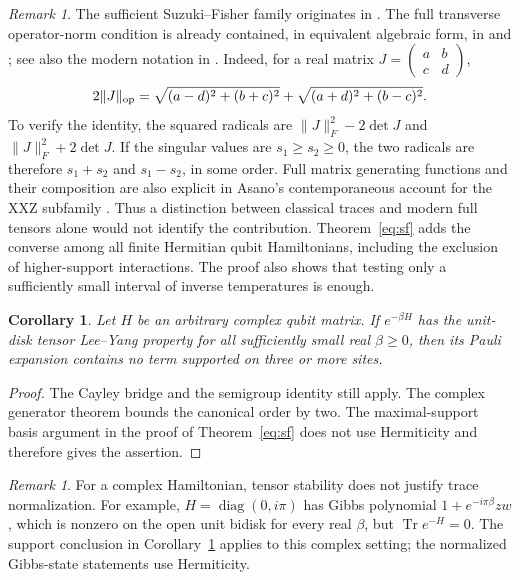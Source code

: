 \documentclass[reqno]{amsart}
\newtheorem{corollary}[theorem]{Corollary}
\theoremstyle{definition}
\theoremstyle{remark}
\newtheorem{remark}[theorem]{Remark}
\DeclareMathOperator{\Tr}{Tr}
\DeclareMathOperator{\diag}{diag}
\begin{document}
\begin{remark}\label{eq:sf-attribution}
The sufficient Suzuki--Fisher family originates in
\cite{SuzukiFisher71,AsanoJapanese70,AsanoPRL70}. The full transverse
operator-norm condition is already contained, in equivalent algebraic
form, in \cite[equation~(2.47)]{SuzukiFisher71} and
\cite[Theorem~2, equation~(8)]{Dunlop79}; see also the modern notation
in \cite[Definition~1 and Fact~3]{BGLW26}. Indeed, for a real matrix
$J=\left(\begin{smallmatrix}a&b\\c&d\end{smallmatrix}\right)$,
\[
 2\|J\|_{\rm op}
 =\sqrt{(a-d)^2+(b+c)^2}+\sqrt{(a+d)^2+(b-c)^2}.
\]
To verify the identity, the squared radicals are
$\|J\|_F^2-2\det J$ and $\|J\|_F^2+2\det J$.
If the singular values are $s_1\geq s_2\geq0$, the two radicals
are therefore $s_1+s_2$ and $s_1-s_2$, in some order.
Full matrix generating functions and their
composition are also explicit in Asano's contemporaneous account for
the XXZ subfamily \cite[equations~(1.15), (3.7)--(3.10)]{AsanoJapanese70}.
Thus a distinction between classical traces and modern full tensors
alone would not identify the contribution. Theorem~\ref{eq:sf}
adds the converse among all finite Hermitian qubit Hamiltonians,
including the exclusion of higher-support interactions.  The proof
also shows that testing only a sufficiently small interval of inverse
temperatures is enough.
\end{remark}

\begin{corollary}\label{eq:complex-support}
Let \(H\) be an arbitrary complex qubit matrix.  If
\(e^{-\beta H}\) has the unit-disk tensor Lee--Yang property for
all sufficiently small real \(\beta\ge0\), then its Pauli
expansion contains no term supported on three or more sites.
\end{corollary}
\begin{proof}
The Cayley bridge and the semigroup identity still apply.  The complex
generator theorem bounds the canonical order by two.  The maximal-support
basis argument in the proof of Theorem~\ref{eq:sf} does not use
Hermiticity and therefore gives the assertion.
\end{proof}

\begin{remark}\label{eq:trace-caveat}
For a complex Hamiltonian, tensor stability does not justify trace
normalization.  For example, \(H=\diag(0,i\pi)\) has Gibbs
polynomial \(1+e^{-i\pi\beta}zw\), which is nonzero on the open
unit bidisk for every real \(\beta\), but
\(\Tr e^{-H}=0\).  The support conclusion in
Corollary~\ref{eq:complex-support} applies to this complex setting;
the normalized Gibbs-state statements use Hermiticity.
\end{remark}
\end{document}
